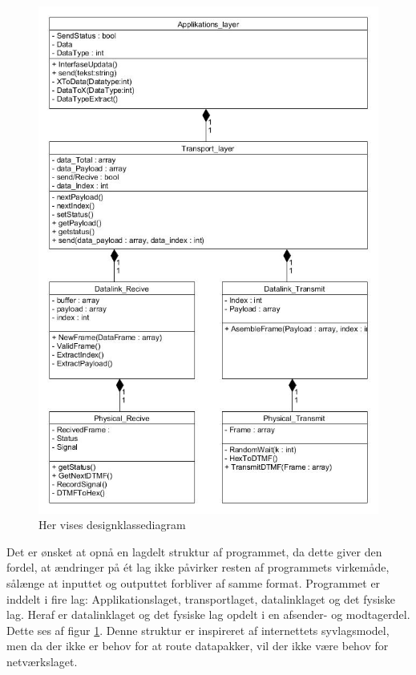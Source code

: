 \begin{figure}[h]
\centering
\includegraphics[scale=0.45]{Billeder/Klassediagram_v1.jpg}
\caption{Her vises designklassediagram}
\label{fig:Klassediagram_v1}
\end{figure}

Det er ønsket at opnå en lagdelt struktur af programmet, da dette giver den fordel, at ændringer på ét lag ikke påvirker resten af programmets virkemåde, sålænge at inputtet og outputtet forbliver af samme format. Programmet er inddelt i fire lag:  Applikationslaget, transportlaget, datalinklaget og det fysiske lag. Heraf er datalinklaget og det fysiske lag opdelt i en afsender- og modtagerdel. Dette ses af figur \ref{fig:Klassediagram_v1}. Denne struktur er inspireret af internettets syvlagsmodel, men da der ikke er behov for at route datapakker, vil der ikke være behov for netværkslaget.

